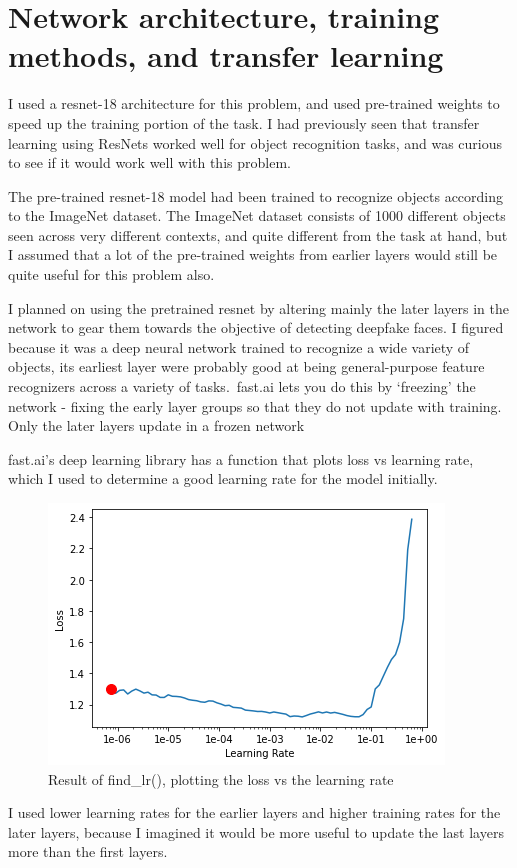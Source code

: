 \documentclass[12pt,letterpaper]{hmcpset}
\begin{document}
\section{Network architecture, training methods, and transfer learning}
I used a resnet-18 architecture for this problem, and used pre-trained weights to speed up the training portion of the task. 
I had previously seen that transfer learning using ResNets worked well for object recognition tasks, and was curious to see if it would work well with this problem. 

The pre-trained resnet-18 model had been trained to recognize objects according to the ImageNet dataset.
The ImageNet dataset consists of 1000 different objects seen across very different contexts, and quite different from the task at hand, but I assumed that a lot of the pre-trained weights from earlier layers would still be quite useful for this problem also.

I planned on using the pretrained resnet by altering mainly the later layers in the network to gear them towards the objective of detecting deepfake faces.
I figured because it was a deep neural network trained to recognize a wide variety of objects, its earliest layer were probably good at being general-purpose feature recognizers across a variety of tasks.\
fast.ai lets you do this by `freezing' the network - fixing the early layer groups so that they do not update with training.
Only the later layers update in a frozen network

fast.ai's deep learning library has a function that plots loss vs learning rate, which I used to determine a good learning rate for the model initially.

\begin{figure}
    \centering
    \includegraphics[width=\textwidth]{lossvlearningrate}
    \caption{Result of find\_lr(), plotting the loss vs the learning rate}
\end{figure}
    I used lower learning rates for the earlier layers and higher training rates for the later layers, because I imagined it would be more useful to update the last layers more than the first layers.
\end{document}
